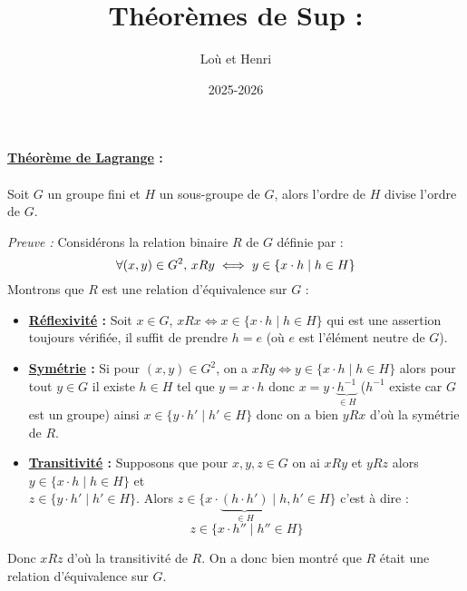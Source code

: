 \documentclass{article}
\title{\textbf{Théorèmes de Sup :}}
\author{Loù et Henri}
\date{2025-2026}
\begin{document}
\maketitle

\begin{tcolorbox}[colback=gray!10, colframe=black, boxrule=1.5pt, arc=0pt,
                  left=4pt, right=4pt, top=4pt, bottom=4pt,
                  leftrule=1.5pt, rightrule=0pt, toprule=0pt, bottomrule=0pt]
 \textbf{\underline{Théorème de Lagrange} :} \\
\\
 Soit $G$ un groupe fini et $H$ un sous-groupe de $G$, alors l'ordre de $H$ divise l'ordre de $G$.
\end{tcolorbox}

\textit{Preuve :} Considérons la relation binaire $R$ de $G$ définie par :
$$\forall (x,y) \in G^2, \thinspace xRy \iff y \in \{x \cdot h \mid h \in H \}$$
Montrons que $R$ est une relation d'équivalence sur $G$ :\\
\begin{itemize}

\item \textbf{\underline{Réflexivité} :} Soit $x \in G$, $xRx \iff x \in \{x \cdot h \mid h \in H\}$ qui est une assertion toujours vérifiée, il suffit de prendre $h = e$ 
(où $e$ est l'élément neutre de $G$).
\\
\item \textbf{\underline{Symétrie} :} Si pour $(x,y) \in G^2$, on a $xRy \iff y \in \{x \cdot h \mid h \in H \}$ alors pour tout 
$y \in G$ il existe $h \in H$ tel que $y = x \cdot h$ donc $x = y \cdot \underbrace{h^{-1}}_{\in H}$ ($h^{-1}$ existe car $G$ est un groupe) ainsi $x \in \{y \cdot h' \mid h' \in H \}$
donc on a bien $yRx$ d'où la symétrie de $R$.
\\
\item \textbf{\underline{Transitivité} :} Supposons que pour $x,y,z \in G$ on ai $xRy$ et $yRz$ alors $y \in \{x \cdot h \mid h \in H \}$ et \\
$z \in \{y \cdot h' \mid h' \in H \}$. Alors $z \in \{x \cdot \underbrace{(h \cdot h')}_{\in H} \mid h,h' \in H \}$ c'est à dire :
$$z \in \{x \cdot h'' \mid h'' \in H \}$$
\end{itemize}
Donc $xRz$ d'où la transitivité de $R$. On a donc bien montré que $R$ était une relation d'équivalence sur $G$.\\
\end{document}
